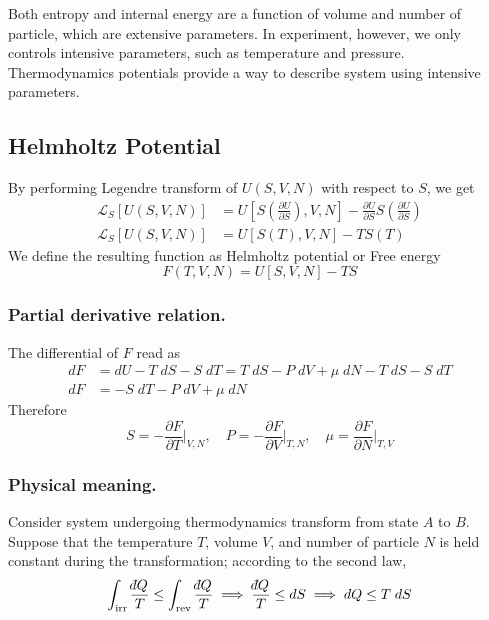 \documentclass[../../../Main.tex]{subfiles}
\begin{document}
Both entropy and internal energy are a function of volume and number of particle, which are extensive parameters. In experiment, however, we only controls intensive parameters, such as temperature and pressure. Thermodynamics potentials provide a way to describe system using intensive parameters.

\subsection*{Helmholtz Potential}
By performing Legendre transform of $U(S,V,N)$ with respect to $S$, we get
\begin{align*}
    \mathcal{L}_S[U(S,V,N)]&=U\left[S\left(\frac{\partial U}{\partial S}\right), V,N\right]-\frac{\partial U}{\partial S}S\left(\frac{\partial U}{\partial S}\right)\\
    \mathcal{L}_S[U(S,V,N)]&=U[S(T),V,N]-TS(T)
\end{align*}
We define the resulting function as Helmholtz potential or Free energy
\begin{equation*}
    F(T,V,N)=U[S,V,N]-TS
\end{equation*}

\subsubsection*{Partial derivative relation.} The differential of $F$ read as
\begin{align*}
    dF&=dU-T\;dS-S\;dT=T\;dS-P\;dV+\mu \;dN-T\;dS-S\;dT\\
    dF&=-S\;dT - P\; dV + \mu \;dN
\end{align*}
Therefore
\begin{equation*}
    S=-\frac{\partial F}{\partial T}\bigg|_{V,N},\quad P=-\frac{\partial F}{\partial V}\bigg|_{T,N},\quad \mu=\frac{\partial F}{\partial N}\bigg|_{T,V}
\end{equation*}

\subsubsection*{Physical meaning.} Consider system undergoing thermodynamics transform from state $A$ to $B$. Suppose that the temperature $T$, volume $V$, and number of particle $N$ is held constant during the transformation; according to the second law,
\begin{equation*}
    \int_\text{irr}\frac{\dbar Q}{T}\leq\int_\text{rev}\frac{\dbar Q}{T} \implies \frac{\dbar Q}{T}\leq d S\implies d Q\leq T\;d S
\end{equation*}
\end{document}
